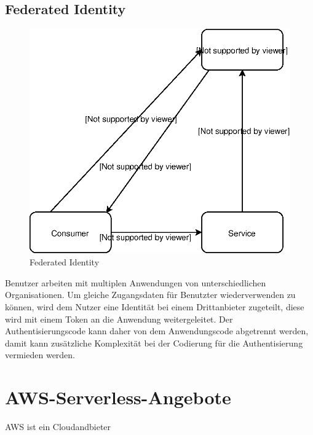 \documentclass[
12pt,
english,
ngerman,
headsepline,
twoside,
openright,
numbers=noenddot,version=first
]{scrreprt}
\begin{document}
\section{Federated Identity}\label{sec:federated-identity}
\begin{figure}[H]
	\centering
\includegraphics[scale=0.60]{./pics/pattern-federated-identity.eps}
\caption{Federated Identity}
\label{pic:federated-identity}
\end{figure}
Benutzer arbeiten mit multiplen Anwendungen von unterschiedlichen Organisationen. Um gleiche Zugangsdaten für Benutzter wiederverwenden zu können, wird dem Nutzer eine Identität bei einem Drittanbieter zugeteilt, diese wird mit einem Token an die Anwendung weitergeleitet. Der Authentisierungscode kann daher von dem Anwendungscode abgetrennt werden, damit kann zusätzliche Komplexität bei der Codierung für die Authentisierung vermieden werden.

\chapter{AWS-Serverless-Angebote}
\label{chap:aws-serverless}
\acrshort{AWS} ist ein Cloudandbieter
\end{document}
